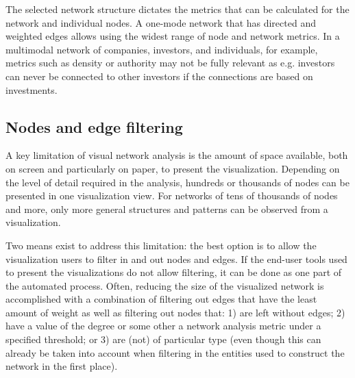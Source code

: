 The selected network structure dictates the metrics that can be calculated for the network and individual nodes. A one-mode network that has directed and weighted edges allows using the widest range of node and network metrics. In a multimodal network of companies, investors, and individuals, for example, metrics such as density or authority may not be fully relevant as e.g. investors can never be connected to other investors if the connections are based on investments.

\subsection{Nodes and edge filtering}

A key limitation of visual network analysis is the amount of space available, both on screen and particularly on paper, to present the visualization. Depending on the level of detail required in the analysis, hundreds or thousands of nodes can be presented in one visualization view. For networks of tens of thousands of nodes and more, only more general structures and patterns can be observed from a visualization. 

Two means exist to address this limitation: the best option is to allow the visualization users to filter in and out nodes and edges. If the end-user tools used to present the visualizations do not allow filtering, it can be done as one part of the automated process. Often, reducing the size of the visualized network is accomplished with a combination of filtering out edges that have the least amount of weight as well as filtering out nodes that: 1) are left without edges; 2) have a value of the degree or some other a network analysis metric under a specified threshold; or 3) are (not) of particular type (even though this can already be taken into account when filtering in the entities used to construct the network in the first place).

